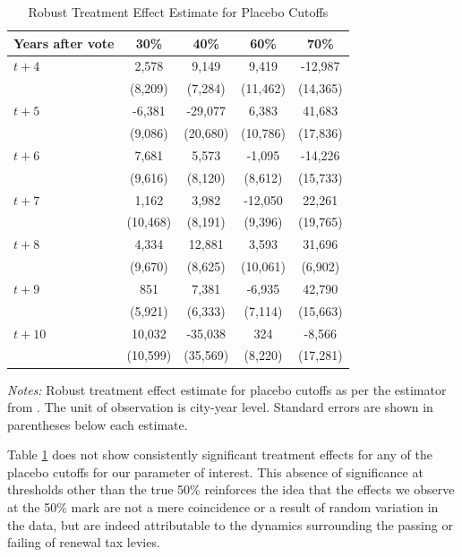 \begin{table}[!ht]
    \centering
    \caption{Robust Treatment Effect Estimate for Placebo Cutoffs}
    \label{tab:placebo_cutoffs}
    \begin{tabular}{p{2cm}cccc}
        \hline
        Years after vote & 30\% & 40\% & 60\% & 70\% \\
        \hline
        $t + 4$ & 2,578 & 9,149 & 9,419 & -12,987 \\
                & (8,209) & (7,284) & (11,462) & (14,365) \\
        $t + 5$ & -6,381 & -29,077 & 6,383 & 41,683 \\
                & (9,086) & (20,680) & (10,786) & (17,836) \\
        $t + 6$ & 7,681 & 5,573 & -1,095 & -14,226 \\
                & (9,616) & (8,120) & (8,612) & (15,733) \\
        $t + 7$ & 1,162 & 3,982 & -12,050 & 22,261 \\
                & (10,468) & (8,191) & (9,396) & (19,765) \\
        $t + 8$ & 4,334 & 12,881 & 3,593 & 31,696 \\
                & (9,670) & (8,625) & (10,061) & (6,902) \\
        $t + 9$ & 851 & 7,381 & -6,935 & 42,790 \\
                & (5,921) & (6,333) & (7,114) & (15,663) \\
        $t + 10$ & 10,032 & -35,038 & 324 & -8,566 \\
                 & (10,599) & (35,569) & (8,220) & (17,281) \\
        \hline
    \end{tabular}
    \begin{tablenotes}
        \small
        \item \textit{Notes:} Robust treatment effect estimate for placebo cutoffs as per the estimator from \cite{calonico2017rdrobust}. The unit of observation is city-year level. Standard errors are shown in parentheses below each estimate.
    \end{tablenotes}
\end{table}


Table \ref{tab:placebo_cutoffs} does not show consistently significant treatment effects for any of the placebo cutoffs for our parameter of interest. This absence of significance at thresholds other than the true 50\% reinforces the idea that the effects we observe at the 50\% mark are not a mere coincidence or a result of random variation in the data, but are indeed attributable to the dynamics surrounding the passing or failing of renewal tax levies. 

